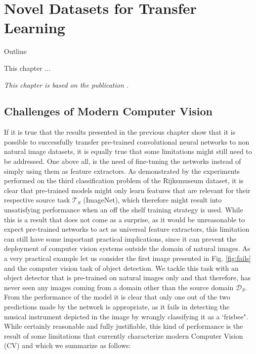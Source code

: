 \chapter{Novel Datasets for Transfer Learning}

\begin{remark}{Outline}

This chapter ...

\vspace{5mm}
\textit{This chapter is based on the publication \citet{sabatelli2021advances}.}
\label{ch:minerva_paper}


\end{remark}


\section{Challenges of Modern Computer Vision}
\label{sec:cv_challenges}

If it is true that the results presented in the previous chapter show that it is possible to successfully transfer pre-trained convolutional neural networks to non natural image datasets, it is equally true that some limitations might still need to be addressed. One above all, is the need of fine-tuning the networks instead of simply using them as feature extractors. As demonstrated by the experiments performed on the third classification problem of the Rijksmuseum dataset, it is clear that pre-trained models might only learn features that are relevant for their respective source task $\mathcal{T}_S$ (ImageNet), which therefore might result into unsatisfying performance when an off the shelf training strategy is used. While this is a result that does not come as a surprise, as it would be unreasonable to expect pre-trained networks to act as universal feature extractors, this limitation can still have some important practical implications, since it can prevent the deployment of computer vision systems outside the domain of natural images. As a very practical example let us consider the first image presented in Fig. \ref{fig:fails} and the computer vision task of object detection. We tackle this task with an object detector that is pre-trained on natural images only and that therefore, has never seen any images coming from a domain other than the source domain $\mathcal{D}_S$. From the performance of the model it is clear that only one out of the two predictions made by the network is appropriate, as it fails in detecting the musical instrument depicted in the image by wrongly classifying it as a `frisbee". While certainly reasonable and fully justifiable, this kind of performance is the result of some limitations that currently characterize modern Computer Vision (CV) and which we summarize as follows:

